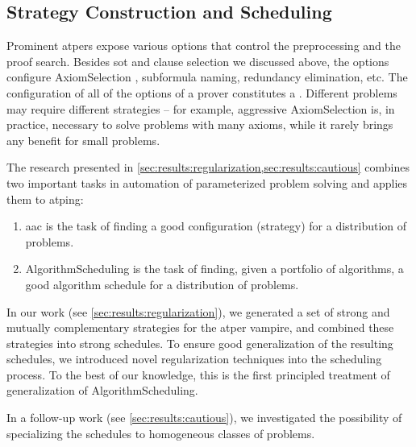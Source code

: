 
\subsection{Strategy Construction and Scheduling}
\label{sec:contrib:schedules}

Prominent \glspl{atper} expose various options that control the preprocessing and the proof search.
Besides \gls{sot} and clause selection we discussed above,
the options configure \gls{AxiomSelection} \cite{DBLP:conf/cade/HoderV11}, subformula naming, redundancy elimination, etc.
The configuration of all of the options of a prover constitutes a .
Different problems may require different strategies -- for example, aggressive \gls{AxiomSelection} is, in practice, necessary to solve problems with many axioms, while it rarely brings any benefit for small problems.

The research presented in \cref{sec:results:regularization,sec:results:cautious} combines two important tasks in automation of parameterized problem solving and applies them to \gls{atping}:
\begin{enumerate}
\item \Gls{aac} is the task of finding a good configuration (strategy) for a distribution of problems.
\item \Gls{AlgorithmScheduling} is the task of finding, given a portfolio of algorithms, a good algorithm schedule for a distribution of problems.
\end{enumerate}
In our work \cite{DBLP:conf/ijcar/BartekCS24} (see \cref{sec:results:regularization}), we generated a set of strong and mutually complementary strategies for the \gls{atper} \gls{vampire},
and combined these strategies into strong schedules.
To ensure good generalization of the resulting schedules,
we introduced novel regularization techniques into the scheduling process.
To the best of our knowledge, this is the first principled treatment of generalization of \gls{AlgorithmScheduling}.

In a follow-up work \cite{DBLP:conf/paar/BartekC024} (see \cref{sec:results:cautious}), we investigated the possibility of specializing the schedules to homogeneous classes of problems.

